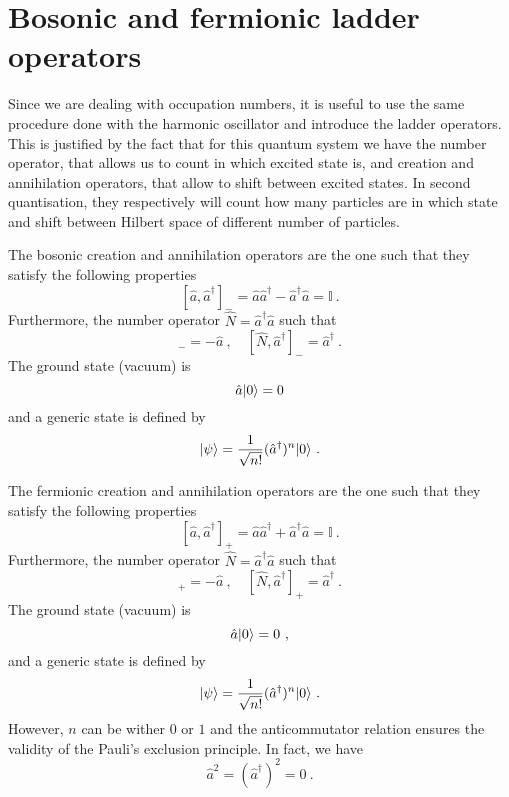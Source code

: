 \section{Bosonic and fermionic ladder operators}

    Since we are dealing with occupation numbers, it is useful to use the same procedure done with the harmonic oscillator and introduce the ladder operators. This is justified by the fact that for this quantum system we have the number operator, that allows us to count in which excited state is, and creation and annihilation operators, that allow to shift between excited states. In second quantisation, they respectively will count how many particles are in which state and shift between Hilbert space of different number of particles.

    The bosonic creation and annihilation operators are the one such that they satisfy the following properties 
    \begin{equation}\label{bos}
        [\hat a, \hat a^\dagger]_- = \hat a \hat a^\dagger - \hat a^\dagger \hat a = \mathbb I~.
    \end{equation}
    Furthermore, the number operator $\hat N = \hat a^\dagger \hat a$ such that 
    \begin{equation*}
        [\hat N, \hat a]_- = - \hat a~, \quad [\hat N, \hat a^\dagger]_- = \hat a^\dagger ~.
    \end{equation*} 
    The ground state (vacuum) is 
    \begin{equation*}
        \hat a \vert0\rangle = 0
    \end{equation*}
    and a generic state is defined by
    \begin{equation*}
        \vert\psi\rangle = \frac{1}{\sqrt{n!}} (\hat a^\dagger)^n \vert0\rangle ~.
    \end{equation*}

    The fermionic creation and annihilation operators are the one such that they satisfy the following properties 
    \begin{equation}\label{ferm}
        [\hat a, \hat a^\dagger]_+ = \hat a \hat a^\dagger + \hat a^\dagger \hat a = \mathbb I ~.
    \end{equation}
    Furthermore, the number operator $\hat N = \hat a^\dagger \hat a$ such that 
    \begin{equation*}
        [\hat N, \hat a]_+ = - \hat a~, \quad [\hat N, \hat a^\dagger]_+ = \hat a^\dagger ~.
    \end{equation*} 
    The ground state (vacuum) is
    \begin{equation*}
        \hat a \vert0\rangle = 0 ~,
    \end{equation*}
    and a generic state is defined by
    \begin{equation*}
        \vert\psi\rangle = \frac{1}{\sqrt{n!}} (\hat a^\dagger)^n \vert0\rangle ~.
    \end{equation*}
    However, $n$ can be wither $0$ or $1$ and the anticommutator relation ensures the validity of the Pauli's exclusion principle. In fact, we have 
    \begin{equation*}
        \hat a^2 = (\hat a^\dagger)^2 = 0 ~.
    \end{equation*}

